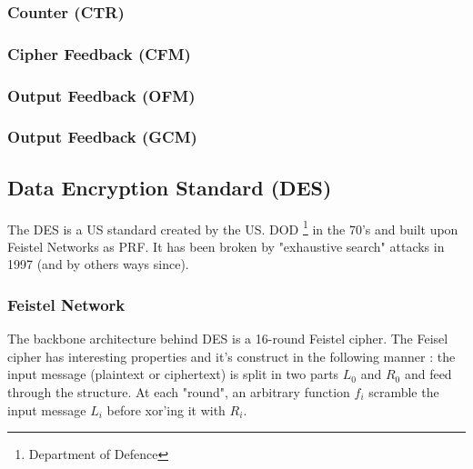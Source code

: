 \subsubsection{ Counter (CTR) }

\subsubsection{ Cipher Feedback (CFM) }

\subsubsection{ Output Feedback (OFM) }

\subsubsection{ Output Feedback (GCM) }


\subsection{Data Encryption Standard (DES)}

The DES is a US standard created by the US. DOD \footnote{Department of Defence} in the 70's and built upon Feistel Networks as PRF. It has been broken by "exhaustive search" attacks in 1997 (and by others ways since).

\subsubsection{Feistel Network}

The backbone architecture behind DES is a 16-round Feistel cipher. The Feisel cipher has interesting properties and it's construct in the following manner : the input message (plaintext or ciphertext) is split in two parts $L_0$ and $R_0$ and feed through the structure. At each "round", an arbitrary function $f_i$ scramble the input message $L_i$ before xor'ing it with $R_i$.

